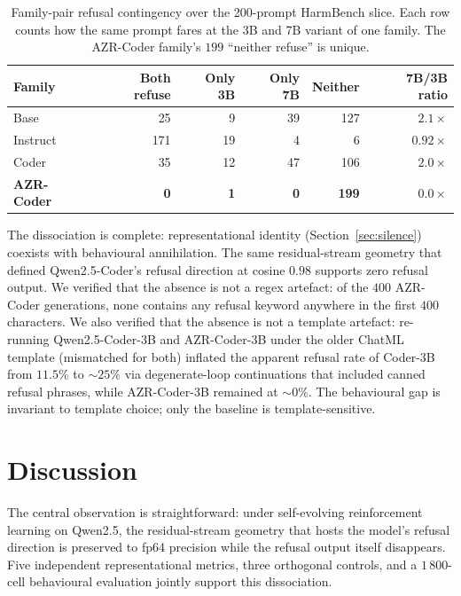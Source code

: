 \documentclass[11pt,a4paper]{article}
\begin{document}
\begin{table}[t]
\centering
\caption{Family-pair refusal contingency over the 200-prompt HarmBench
slice. Each row counts how the same prompt fares at the 3B and 7B variant
of one family. The AZR-Coder family's $199$ ``neither refuse'' is unique.}
\label{tab:contingency}
\begin{tabular}{lrrrrr}
\toprule
\textbf{Family} & \textbf{Both refuse} & \textbf{Only 3B} & \textbf{Only 7B} & \textbf{Neither} & \textbf{7B/3B ratio} \\
\midrule
Base & 25 & 9 & 39 & 127 & $2.1\times$ \\
Instruct & 171 & 19 & 4 & 6 & $0.92\times$ \\
Coder & 35 & 12 & 47 & 106 & $2.0\times$ \\
\textbf{AZR-Coder} & \textbf{0} & \textbf{1} & \textbf{0} & \textbf{199} & $\mathbf{0.0\times}$ \\
\bottomrule
\end{tabular}
\end{table}

The dissociation is complete: representational identity
(Section~\ref{sec:silence}) coexists with behavioural annihilation. The
same residual-stream geometry that defined Qwen2.5-Coder's refusal
direction at cosine $0.98$ supports zero refusal output. We verified that
the absence is not a regex artefact: of the $400$ AZR-Coder generations,
none contains any refusal keyword anywhere in the first $400$ characters.
We also verified that the absence is not a template artefact: re-running
Qwen2.5-Coder-3B and AZR-Coder-3B under the older ChatML template
(mismatched for both) inflated the apparent refusal rate of Coder-3B from
$11.5\%$ to $\sim 25\%$ via degenerate-loop continuations that included
canned refusal phrases, while AZR-Coder-3B remained at $\sim 0\%$. The
behavioural gap is invariant to template choice; only the baseline is
template-sensitive.

\section{Discussion}

The central observation is straightforward: under self-evolving
reinforcement learning on Qwen2.5, the residual-stream geometry that
hosts the model's refusal direction is preserved to fp64 precision while
the refusal output itself disappears. Five independent representational
metrics, three orthogonal controls, and a $1\,800$-cell behavioural
evaluation jointly support this dissociation.
\end{document}
